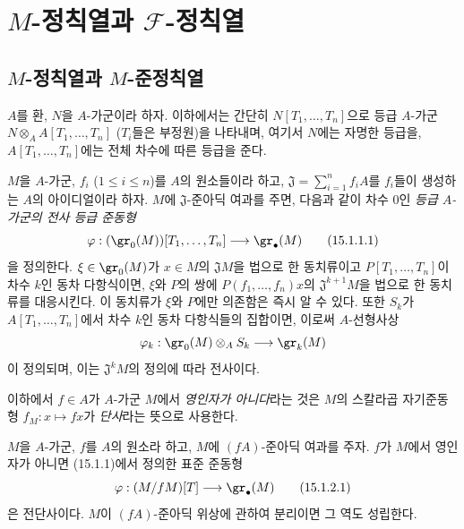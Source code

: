 \section{\texorpdfstring{$M$}{M}-정칙열과
\texorpdfstring{$\mathscr F$}{F}-정칙열}
\label{section:0.15-fr}

\subsection{\texorpdfstring{$M$}{M}-정칙열과
\texorpdfstring{$M$}{M}-준정칙열}
\label{subsection:0.15.1-fr}
\label{0.15.1-fr}

\begin{env}[15.1.1]
\label{0.15.1.1-fr}
$A$를 환, $N$을 $A$-가군이라 하자. 이하에서는 간단히
$N[T_1,\ldots,T_n]$으로 등급 $A$-가군
$N\otimes_A A[T_1,\ldots,T_n]$ ($T_i$들은 부정원)을 나타내며, 여기서
$N$에는 자명한 등급을, $A[T_1,\ldots,T_n]$에는 전체 차수에 따른 등급을
준다.

$M$을 $A$-가군, $f_i$ ($1\leq i\leq n$)를 $A$의 원소들이라 하고,
$\mathfrak{J}=\sum_{i=1}^n f_iA$를 $f_i$들이 생성하는 $A$의
아이디얼이라 하자. $M$에 $\mathfrak J$-준아딕 여과를 주면, 다음과
같이 차수 $0$인 \emph{등급 $A$-가군의 전사 등급 준동형}
\[
  \varphi : (\gr_0(M))[T_1,\ldots,T_n]\longrightarrow\gr_\bullet(M)
  \tag{15.1.1.1}\label{0.15.1.1.1-fr}
\]
을 정의한다. $\xi\in\gr_0(M)$가 $x\in M$의
$\mathfrak{J}M$을 법으로 한 동치류이고
$P[T_1,\ldots,T_n]$이 차수 $k$인 동차 다항식이면, $\xi$와 $P$의
쌍에 $P(f_1,\ldots,f_n)x$의 $\mathfrak{J}^{k+1}M$을 법으로 한
동치류를 대응시킨다. 이 동치류가
$\xi$와 $P$에만 의존함은 즉시 알 수 있다. 또한 $S_k$가
$A[T_1,\ldots,T_n]$에서 차수 $k$인 동차 다항식들의 집합이면, 이로써
$A$-선형사상
\[
  \varphi_k:\gr_0(M)\otimes_A S_k\longrightarrow\gr_k(M)
\]
이 정의되며, 이는 $\mathfrak{J}^kM$의 정의에 따라 전사이다.

이하에서 $f\in A$가 $A$-가군 $M$에서 \emph{영인자가 아니다}라는 것은
$M$의 스칼라곱 자기준동형 $f_M:x\mapsto fx$가 \emph{단사}라는 뜻으로
사용한다.
\end{env}

\begin{lemma}[15.1.2]
\label{0.15.1.2-fr}
$M$을 $A$-가군, $f$를 $A$의 원소라 하고, $M$에 $(fA)$-준아딕
여과를 주자. $f$가 $M$에서 영인자가 아니면 (15.1.1)에서 정의한 표준
준동형
\[
  \varphi:(M/fM)[T]\longrightarrow\gr_\bullet(M)
  \tag{15.1.2.1}\label{0.15.1.2.1-fr}
\]
은 전단사이다. $M$이 $(fA)$-준아딕 위상에 관하여 분리이면 그 역도
성립한다.
\end{lemma}

